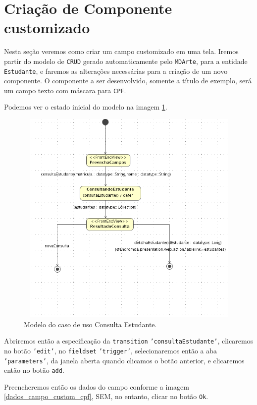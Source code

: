 \section{Criação de Componente customizado}

Nesta seção veremos como criar um campo customizado em uma tela. Iremos partir
do modelo de \texttt{CRUD} gerado automaticamente pelo \texttt{MDArte}, para a
entidade \texttt{Estudante}, e faremos as alterações necessárias para a criação
de um novo componente. O componente a ser desenvolvido, somente a título de
exemplo, será um campo texto com máscara para \texttt{CPF}.

Podemos ver o estado inicial do modelo na imagem \ref{modelo_consulta_estudante_custom}.

\begin{figure}[H]
	\centering
	\includegraphics[width=350pt,height=300pt]{files/imgs/tutorial-mdarte-0028.png}
	\caption{Modelo do caso de uso Consulta Estudante.}
	\label{modelo_consulta_estudante_custom}
\end{figure}

Abriremos então a especificação da \texttt{transition}
\texttt{'consultaEstudante'}, clicaremos no botão \texttt{'edit'}, no
\texttt{fieldset} \texttt{'trigger'}, selecionaremos então a aba
\texttt{'parameters'}, da janela aberta quando clicamos o botão anterior, e
clicaremos então no botão \texttt{add}.

Preencheremos então os dados do campo conforme a imagem
\ref{dados_campo_custom_cpf}, SEM, no entanto, clicar no botão \texttt{Ok}.

